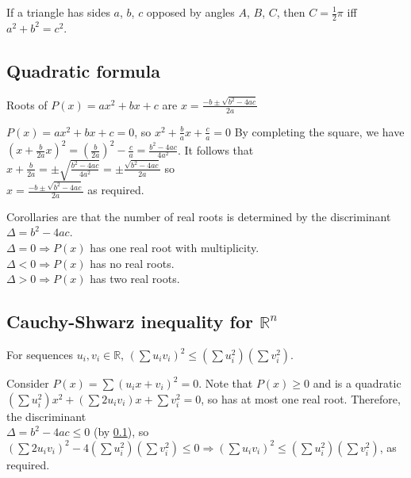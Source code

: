 \documentclass[a4paper,11pt]{article}
\begin{document}

    If a triangle has sides $a$, $b$, $c$ opposed by angles $A$, $B$, $C$,
    then $C = \frac 12 \pi$ iff $a^2 + b^2 = c^2$.

    \subsection{Quadratic formula} \label{sec:quad_formula}

    Roots of $P(x) = ax^2 + bx + c$ are
    $x = \frac{-b \pm \sqrt{b^2 - 4ac}}{2a}$

    $P(x) = ax^2 + bx + c = 0$, so $x^2 + \frac{b}{a}x + \frac{c}{a} = 0$
    By completing the square, we have
    \\$(x + \frac{b}{2a}x)^2 = (\frac{b}{2a})^2 - \frac{c}{a}
    = \frac{b^2 - 4ac}{4a^2}$. It follows that
    \\$x + \frac{b}{2a} = \pm \sqrt{\frac{b^2 - 4ac}{4a^2}}
    = \pm \frac{\sqrt{b^2 - 4ac}}{2a}$ so
    \\$x = \frac{-b \pm \sqrt{b^2 - 4ac}}{2a}$ as required.

    Corollaries are that the number of real roots is determined by the
    discriminant \\$\Delta = b^2 - 4ac$.
    \\$\Delta = 0 \Rightarrow P(x)$ has one real root with multiplicity.
    \\$\Delta < 0 \Rightarrow P(x)$ has no real roots.
    \\$\Delta > 0 \Rightarrow P(x)$ has two real roots.

    \subsection{Cauchy-Shwarz inequality for $\mathbb{R}^n$}

    For sequences $u_i, v_i \in \mathbb{R}$,
    $(\sum u_i v_i)^2 \le (\sum u_i^2) (\sum v_i^2)$.

    Consider
    $P(x) = \sum (u_i x + v_i)^2 = 0$. Note that $P(x) \ge 0$ and is a quadratic
    \\$(\sum u_i^2) x^2 + (\sum 2 u_i v_i) x + \sum v_i^2 = 0$, so has
    at most one real root. Therefore, the discriminant
    \\$\Delta = b^2 - 4ac \le 0$ (by \ref{sec:quad_formula}), so
    $(\sum 2 u_i v_i)^2 - 4(\sum u_i^2)(\sum v_i^2) \le 0 \Rightarrow
     (\sum u_i v_i)^2 \le (\sum u_i^2) (\sum v_i^2)$, as required.
\end{document}
